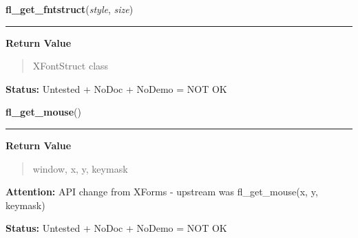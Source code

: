     \label{xformslib:library:fl_get_fontstruct}

    \vspace{0.5ex}

\hspace{.8\funcindent}\begin{boxedminipage}{\funcwidth}

    \raggedright \textbf{fl\_get\_fntstruct}(\textit{style}, \textit{size})

    \vspace{-1.5ex}

    \rule{\textwidth}{0.5\fboxrule}
\setlength{\parskip}{2ex}
\setlength{\parskip}{1ex}
      \textbf{Return Value}
    \vspace{-1ex}

      \begin{quote}
      XFontStruct class

      \end{quote}

\textbf{Status:} Untested + NoDoc + NoDemo = NOT OK



    \end{boxedminipage}

    \label{xformslib:library:fl_get_mouse}

    \vspace{0.5ex}

\hspace{.8\funcindent}\begin{boxedminipage}{\funcwidth}

    \raggedright \textbf{fl\_get\_mouse}()

    \vspace{-1.5ex}

    \rule{\textwidth}{0.5\fboxrule}
\setlength{\parskip}{2ex}
\setlength{\parskip}{1ex}
      \textbf{Return Value}
    \vspace{-1ex}

      \begin{quote}
      window, x, y, keymask

      \end{quote}

\textbf{Attention:} API change from XForms - upstream was fl\_get\_mouse(x, y, keymask)



\textbf{Status:} Untested + NoDoc + NoDemo = NOT OK



    \end{boxedminipage}

